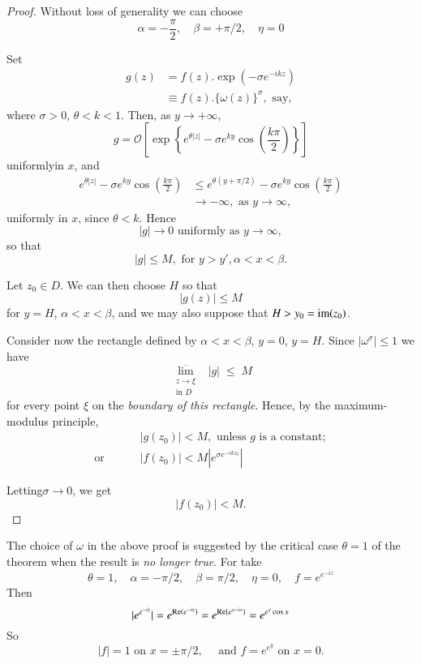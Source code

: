 \begin{proof}
Without loss of generality we can choose
$$
\alpha = -\frac{\pi}{2}, \quad \beta = + \pi/2, \quad \eta =0
$$

Set 
\begin{align*}
g(z) & = f(z). \exp (-\sigma e^{-ikz})\\
& \equiv f(z). \{\omega(z)\}^{\sigma} , \text{ say},
\end{align*}
where $\sigma >0$, $\theta < k < 1$. Then, as $y \to + \infty$,
$$
g = \mathcal{O} \left[\exp \left\{e^{\theta|z|} - \sigma e^{ky} \cos
  \left(\frac{k\pi}{2}\right) \right\}\right] 
$$
uniformly\pageoriginale in $x$, and 
\begin{align*}
e^{\theta|z|} - \sigma e^{ky} \cos\left(\frac{k\pi}{2}\right) & \leq e^{\theta(y +
  \pi/2)} - \sigma e^{ky} \cos\left(\frac{k\pi}{2}\right)\\
& \to - \infty, \text{ as } y \to \infty,
\end{align*}
uniformly in $x$, since $\theta < k$. Hence
$$
|g| \to 0 \text{ uniformly as } y \to \infty,
$$
so that
$$
|g| \leq M, \text{ for } y > y', \alpha < x < \beta.
$$

Let $z_0 \in D$. We can then choose $H$ so that
$$
|g(z)| \leq M
$$
for $y = H$, $\alpha < x < \beta$, and we may also suppose that $H>
y_0 = \operatorname{im} (z_0)$. 

Consider now the rectangle defined by $\alpha < x < \beta$, $y = 0$,
$y = H$. Since $|\omega^\sigma| \leq 1$ we have
$$
\overline{\lim\limits_{\substack{z \to \xi\\ \text{in $D$}}}} \;\;
|g| \; \leq \; M
$$
for every point $\xi$ on the \textit{boundary of this
  rectangle}. Hence, by the maximum-modulus principle,
\begin{align*}
& |g(z_0)| < M, \text{ unless $g$ is a constant};\\
\text{or } \qquad & |f(z_0)| < M | e^{\sigma e^{-ikz_0}} |\qquad 
\end{align*}

Letting\pageoriginale $\sigma \to 0$, we get
$$
|f(z_0)| < M.
$$
\end{proof}

\begin{remarks*}
The choice of $\omega$ in the above proof is suggested by the critical
case $\theta =1$ of the theorem when the result is {\em no longer
  true}. For take 
$$
\theta = 1, \quad \alpha = - \pi/2, \quad \beta = \pi/2, \quad \eta =
0, \quad f = e^{e^{-iz}}
$$
Then
$$
|e^{e^{-iz}}| = e^{\operatorname{Re}(e^{-iz})} = e^{\operatorname{Re}\{e^{y - ix}\}} = e^{e^y \cos
x}
$$
So
$$
|f| = 1 \text{ on } x = \pm \pi/2, \quad \text{ and } f = e^{e^y}
\text{ on } x =0.
$$
\end{remarks*}


